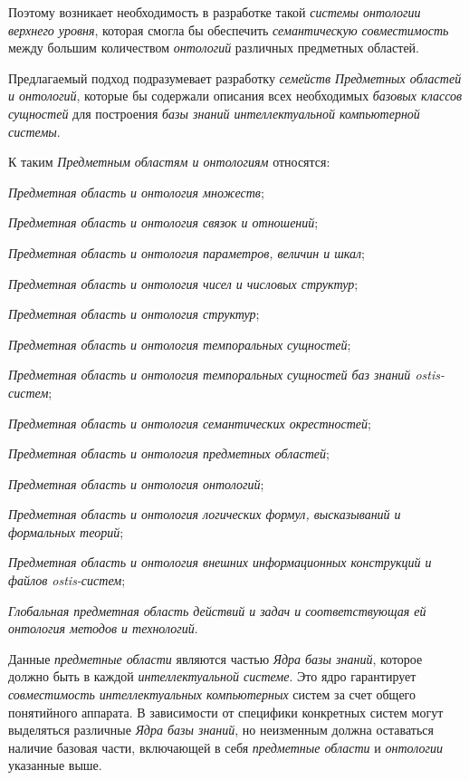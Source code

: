 Поэтому возникает необходимость в разработке такой \textit{системы онтологии верхнего уровня}, которая смогла бы обеспечить \textit{семантическую совместимость} между большим количеством \textit{онтологий} различных предметных областей.

Предлагаемый подход подразумевает разработку \textit{семейств Предметных областей и онтологий}, которые бы содержали описания всех необходимых \textit{базовых классов сущностей} для построения \textit{базы знаний интеллектуальной компьютерной системы}.

К таким \textit{Предметным областям и онтологиям} относятся:

\begin{textitemize}
\item \textit{Предметная область и онтология множеств};
\item \textit{Предметная область и онтология связок и отношений};
\item \textit{Предметная область и онтология параметров, величин и шкал};
\item \textit{Предметная область и онтология чисел и числовых структур};
\item \textit{Предметная область и онтология структур};
\item \textit{Предметная область и онтология темпоральных сущностей};
\item \textit{Предметная область и онтология темпоральных сущностей баз знаний ostis-систем};
\item \textit{Предметная область и онтология семантических окрестностей};
\item \textit{Предметная область и онтология предметных областей};
\item \textit{Предметная область и онтология онтологий};
\item \textit{Предметная область и онтология логических формул, высказываний и формальных теорий};
\item \textit{Предметная область и онтология внешних информационных конструкций и файлов ostis-систем};
\item \textit{Глобальная предметная область действий и задач и соответствующая ей онтология методов и технологий}.
\end{textitemize}

Данные \textit{предметные области} являются частью \textit{Ядра базы знаний}, которое должно быть в каждой \textit{интеллектуальной системе}. Это ядро гарантирует \textit{совместимость интеллектуальных компьютерных} систем за счет общего понятийного аппарата. В зависимости от специфики конкретных систем могут выделяться различные \textit{Ядра базы знаний}, но неизменным должна оставаться наличие базовая части, включающей в себя \textit{предметные области} и \textit{онтологии} указанные выше.

